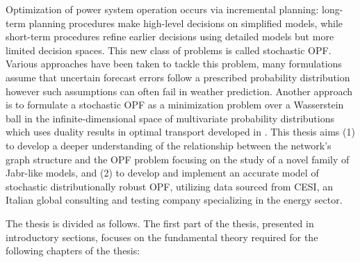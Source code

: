 \documentclass[11pt,a4paper,oneside,openany]{book}
\numberwithin{definition}{section}
\numberwithin{theorem}{section}
\numberwithin{problem}{section}
\begin{document}
 Optimization of power system operation occurs via incremental planning: long-term planning procedures make high-level decisions on simplified models, while short-term procedures refine earlier decisions using detailed models but more limited decision spaces. This new class of problems is called stochastic OPF.
 Various approaches have been taken to tackle this problem, many formulations assume that uncertain forecast errors follow a prescribed probability distribution \cite{CCDOPF} however such assumptions can often fail in weather prediction.
 Another approach is to formulate a stochastic OPF as a minimization problem over a Wasserstein ball in the infinite-dimensional space of multivariate probability distributions \cite{DBDRSOPF} which uses duality results in optimal transport developed in \cite{distibRobWasserstein}. This thesis aims (1) to develop a deeper understanding of the relationship between the network's graph structure and the OPF problem focusing on the study of a novel family of Jabr-like models, and (2) to develop and implement an accurate model of stochastic distributionally robust OPF, utilizing data sourced from CESI, an Italian global consulting and testing company specializing in the energy sector. 
\par 
 The thesis is divided as follows. The first part of the thesis, presented in introductory sections, focuses on the fundamental theory required for the following chapters of the thesis:
\end{document}
